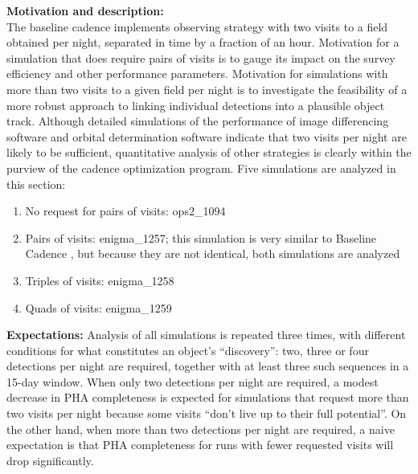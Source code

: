 {\bf Motivation and description:}\\
The baseline cadence implements observing strategy with two visits to a field obtained per night,
separated in time by a fraction of an hour. Motivation for a simulation that does require pairs of
visits is to gauge its impact on the survey efficiency and other performance
parameters. Motivation for simulations with more than two visits to a given field per night
is to investigate the feasibility of a more robust approach to linking individual detections into
a plausible object track. Although detailed simulations of the performance of image differencing
software and orbital determination software indicate that two visits per night are likely to be
sufficient, quantitative analysis of other strategies is clearly within the purview of the cadence
optimization program.  Five simulations are analyzed in this section:
\begin{enumerate}
\item No request for pairs of visits: ops2\_1094
\item Pairs of visits: enigma\_1257; this simulation is very similar to Baseline Cadence
, but because they are not identical, both simulations are analyzed
\item Triples of visits: enigma\_1258
\item Quads of visits: enigma\_1259
\end{enumerate}



{\bf Expectations:}  Analysis of all simulations is repeated three times, with different
conditions for what constitutes an object's ``discovery'':  two, three or four
detections per night are required, together with at least three such sequences in a
15-day window.  When only two detections per night are required, a modest decrease
in PHA completeness is expected for simulations that request more than two visits per night
because some visits ``don't live up to their full potential''. On the other hand, when more
than two detections per night are required, a naive expectation is that PHA completeness
for runs with fewer requested visits will drop significantly.
\\


